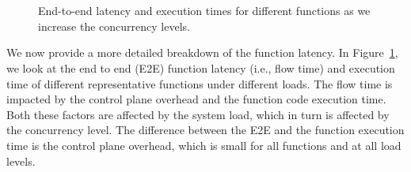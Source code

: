 \begin{figure}
  \centering
  \\
\\
  \caption{End-to-end latency and execution times for different functions as we increase the concurrency levels.}
  \label{fig:flow-fn-all}
\end{figure}

We now provide a more detailed breakdown of the function latency.  
In Figure~\ref{fig:flow-fn-all}, we look at the end to end (E2E) function latency (i.e., flow time) and execution time of different representative functions under different loads.
The flow time is impacted by the control plane overhead and the function code execution time. 
Both these factors are affected by the system load, which in turn is affected by the concurrency level.
The difference between the E2E and the function execution time is the control plane overhead, which is small for all functions and at all load levels.


